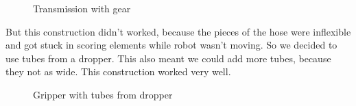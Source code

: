    \begin{figure}[H]
		\begin{minipage}[h]{\linewidth}
			\caption{Transmission with gear}
		\end{minipage}
	\end{figure}   
But this construction didn't worked, because the pieces of the hose were inflexible and got stuck in scoring elements while robot wasn't moving. So we decided to use tubes from a dropper. This also meant we could add more tubes, because they not as wide. This construction worked very well.
   \begin{figure}[H]
		\begin{minipage}[h]{\linewidth}
			\caption{Gripper with tubes from dropper}
		\end{minipage}
	\end{figure}
	
\fillpage	
